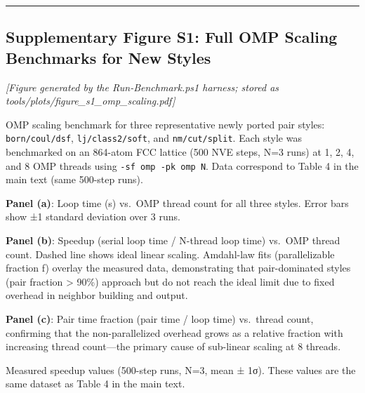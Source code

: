 \documentclass[
  11pt,
]{article}
\begin{document}
\begin{center}\rule{0.5\linewidth}{0.5pt}\end{center}

\subsection{Supplementary Figure S1: Full OMP Scaling Benchmarks for New
Styles}\label{supplementary-figure-s1-full-omp-scaling-benchmarks-for-new-styles}

\emph{{[}Figure generated by the Run-Benchmark.ps1 harness; stored as
tools/plots/figure\_s1\_omp\_scaling.pdf{]}}

OMP scaling benchmark for three representative newly ported pair styles:
\texttt{born/coul/dsf}, \texttt{lj/class2/soft}, and
\texttt{nm/cut/split}. Each style was benchmarked on an 864-atom FCC
lattice (500 NVE steps, N=3 runs) at 1, 2, 4, and 8 OMP threads using
\texttt{-sf\ omp\ -pk\ omp\ N}. Data correspond to Table 4 in the main
text (same 500-step runs).

\textbf{Panel (a)}: Loop time (s) vs.~OMP thread count for all three
styles. Error bars show ±1 standard deviation over 3 runs.

\textbf{Panel (b)}: Speedup (serial loop time / N-thread loop time)
vs.~OMP thread count. Dashed line shows ideal linear scaling. Amdahl-law
fits (parallelizable fraction f) overlay the measured data,
demonstrating that pair-dominated styles (pair fraction \textgreater{}
90\%) approach but do not reach the ideal limit due to fixed overhead in
neighbor building and output.

\textbf{Panel (c)}: Pair time fraction (pair time / loop time)
vs.~thread count, confirming that the non-parallelized overhead grows as
a relative fraction with increasing thread count---the primary cause of
sub-linear scaling at 8 threads.

Measured speedup values (500-step runs, N=3, mean ± 1σ). These values
are the same dataset as Table 4 in the main text.
\end{document}
